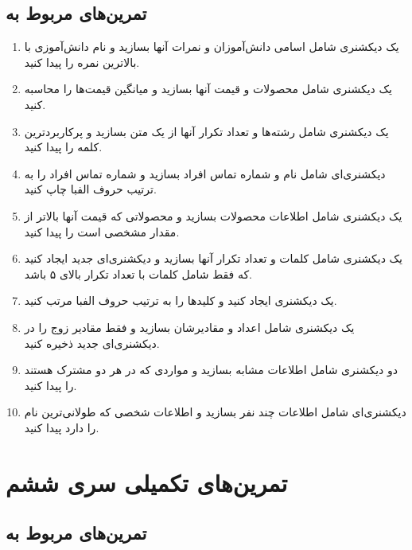 \documentclass[a4paper,12pt]{article}
\begin{document}
	\subsection*{تمرین‌های مربوط به }
	
	\begin{enumerate}
		\item یک دیکشنری شامل اسامی دانش‌آموزان و نمرات آنها بسازید و نام دانش‌آموزی با بالاترین نمره را پیدا کنید.
		\item یک دیکشنری شامل محصولات و قیمت آنها بسازید و میانگین قیمت‌ها را محاسبه کنید.
		\item یک دیکشنری شامل رشته‌ها و تعداد تکرار آنها از یک متن بسازید و پرکاربردترین کلمه را پیدا کنید.
		\item دیکشنری‌ای شامل نام و شماره تماس افراد بسازید و شماره تماس افراد را به ترتیب حروف الفبا چاپ کنید.
		\item یک دیکشنری شامل اطلاعات محصولات بسازید و محصولاتی که قیمت آنها بالاتر از مقدار مشخصی است را پیدا کنید.
		\item یک دیکشنری شامل کلمات و تعداد تکرار آنها بسازید و دیکشنری‌ای جدید ایجاد کنید که فقط شامل کلمات با تعداد تکرار بالای ۵ باشد.
		\item یک دیکشنری ایجاد کنید و کلیدها را به ترتیب حروف الفبا مرتب کنید.
		\item یک دیکشنری شامل اعداد و مقادیرشان بسازید و فقط مقادیر زوج را در دیکشنری‌ای جدید ذخیره کنید.
		\item دو دیکشنری شامل اطلاعات مشابه بسازید و مواردی که در هر دو مشترک هستند را پیدا کنید.
		\item دیکشنری‌ای شامل اطلاعات چند نفر بسازید و اطلاعات شخصی که طولانی‌ترین نام را دارد پیدا کنید.
	\end{enumerate}
	
	
	
	\newpage
	\section*{تمرین‌های تکمیلی سری ششم}
	
	\subsection*{تمرین‌های مربوط به }
	
\end{document}
